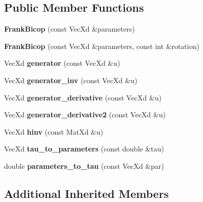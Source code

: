 \subsection*{Public Member Functions}
\begin{DoxyCompactItemize}
\item 
\hypertarget{class_frank_bicop_ae019221e15eba598f29d9120ac6d1f5c}{{\bfseries Frank\+Bicop} (const Vec\+Xd \&parameters)}\label{class_frank_bicop_ae019221e15eba598f29d9120ac6d1f5c}

\item 
\hypertarget{class_frank_bicop_af789907cefc0049b2ce6ea4596195d48}{{\bfseries Frank\+Bicop} (const Vec\+Xd \&parameters, const int \&rotation)}\label{class_frank_bicop_af789907cefc0049b2ce6ea4596195d48}

\item 
\hypertarget{class_frank_bicop_aac20b71ec67ea5067c5342c085a0e306}{Vec\+Xd {\bfseries generator} (const Vec\+Xd \&u)}\label{class_frank_bicop_aac20b71ec67ea5067c5342c085a0e306}

\item 
\hypertarget{class_frank_bicop_a3e433ca2c858e95c11896d2d6a445648}{Vec\+Xd {\bfseries generator\+\_\+inv} (const Vec\+Xd \&u)}\label{class_frank_bicop_a3e433ca2c858e95c11896d2d6a445648}

\item 
\hypertarget{class_frank_bicop_a19d2a80d449caa48d75690be81c2db02}{Vec\+Xd {\bfseries generator\+\_\+derivative} (const Vec\+Xd \&u)}\label{class_frank_bicop_a19d2a80d449caa48d75690be81c2db02}

\item 
\hypertarget{class_frank_bicop_a07d9488138a598fa9aa770da2153f269}{Vec\+Xd {\bfseries generator\+\_\+derivative2} (const Vec\+Xd \&u)}\label{class_frank_bicop_a07d9488138a598fa9aa770da2153f269}

\item 
\hypertarget{class_frank_bicop_ab755de64fbdf692303b4d6436bb41583}{Vec\+Xd {\bfseries hinv} (const Mat\+Xd \&u)}\label{class_frank_bicop_ab755de64fbdf692303b4d6436bb41583}

\item 
\hypertarget{class_frank_bicop_ad4c350e726aa9ca7682d77c3e4e6ed3c}{Vec\+Xd {\bfseries tau\+\_\+to\+\_\+parameters} (const double \&tau)}\label{class_frank_bicop_ad4c350e726aa9ca7682d77c3e4e6ed3c}

\item 
\hypertarget{class_frank_bicop_a59f4a4bbe5eb724d18091c2cd379e268}{double {\bfseries parameters\+\_\+to\+\_\+tau} (const Vec\+Xd \&par)}\label{class_frank_bicop_a59f4a4bbe5eb724d18091c2cd379e268}

\end{DoxyCompactItemize}
\subsection*{Additional Inherited Members}
